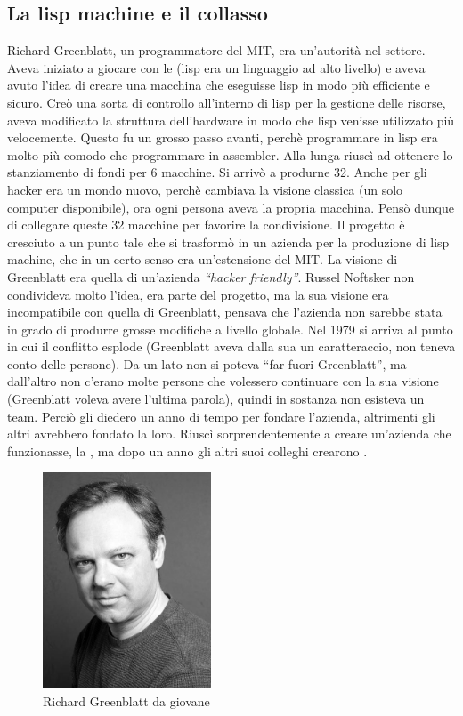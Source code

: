 \subsection{La lisp machine e il collasso}

Richard Greenblatt, un programmatore del MIT, era un'autorità nel settore. Aveva iniziato a giocare con le  (lisp era un linguaggio ad alto livello) e aveva avuto l'idea di creare una macchina che eseguisse lisp in modo più efficiente e sicuro. Creò una sorta di controllo all'interno di lisp per la gestione delle risorse, aveva modificato la struttura dell'hardware in modo che lisp venisse utilizzato più velocemente. Questo fu un grosso passo avanti, perchè programmare in lisp era molto più comodo che programmare in assembler. Alla lunga riuscì ad ottenere lo stanziamento di fondi per 6 macchine. Si arrivò a produrne 32. Anche per gli hacker era un mondo nuovo, perchè cambiava la visione classica (un solo computer disponibile), ora ogni persona aveva la propria macchina. Pensò dunque di collegare queste 32 macchine per favorire la condivisione. Il progetto è cresciuto a un punto tale che si trasformò in un azienda per la produzione di lisp machine, che in un certo senso era un'estensione del MIT. La visione di Greenblatt era quella di un'azienda \textit{``hacker friendly''}. Russel Noftsker non condivideva molto l'idea, era parte del progetto, ma la sua visione era incompatibile con quella di Greenblatt, pensava che l'azienda non sarebbe stata in grado di produrre grosse modifiche a livello globale.
Nel 1979 si arriva al punto in cui il conflitto esplode (Greenblatt aveva dalla sua un caratteraccio, non teneva conto delle persone). Da un lato non si poteva ``far fuori Greenblatt'', ma dall'altro non c'erano molte persone che volessero continuare con la sua visione (Greenblatt voleva avere l'ultima parola), quindi in sostanza non esisteva un team. Perciò gli diedero un anno di tempo per fondare l'azienda, altrimenti gli altri avrebbero fondato la loro. Riuscì sorprendentemente a creare un'azienda che funzionasse, la , ma dopo un anno gli altri suoi colleghi crearono .

\begin{figure}[htbp]
\centering
\includegraphics[width=50mm]{images/greenblatt.jpg}
\caption{Richard Greenblatt da giovane}
\end{figure}


